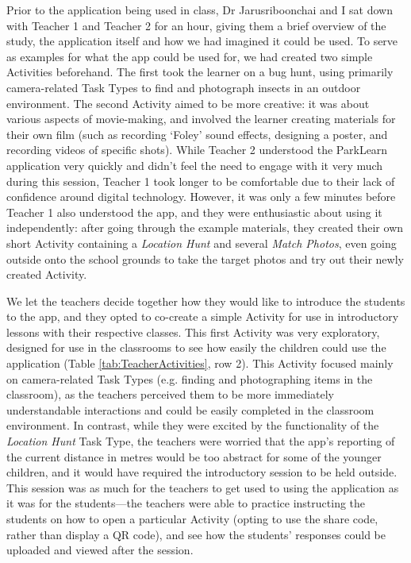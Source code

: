 Prior to the application being used in class, Dr Jarusriboonchai and I sat down with Teacher 1 and Teacher 2 for an hour, giving them a brief overview of the study, the application itself and how we had imagined it could be used. To serve as examples for what the app could be used for, we had created two simple Activities beforehand. The first took the learner on a bug hunt, using primarily camera-related Task Types to find and photograph insects in an outdoor environment. The second Activity aimed to be more creative: it was about various aspects of movie-making, and involved the learner creating materials for their own film (such as recording `Foley' sound effects, designing a poster, and recording videos of specific shots). While Teacher 2 understood the ParkLearn application very quickly and didn't feel the need to engage with it very much during this session, Teacher 1 took longer to be comfortable due to their lack of confidence around digital technology. However, it was only a few minutes before Teacher 1 also understood the app, and they were enthusiastic about using it independently: after going through the example materials, they created their own short Activity containing a \textit{Location Hunt} and several \textit{Match Photos}, even going outside onto the school grounds to take the target photos and try out their newly created Activity. 

We let the teachers decide together how they would like to introduce the students to the app, and they opted to co-create a simple Activity for use in introductory lessons with their respective classes. This first Activity was very exploratory, designed for use in the classrooms to see how easily the children could use the application (Table \ref{tab:TeacherActivities}, row 2). This Activity focused mainly on camera-related Task Types (e.g. finding and photographing items in the classroom), as the teachers perceived them to be more immediately understandable interactions and could be easily completed in the classroom environment. In contrast, while they were excited by the functionality of the \textit{Location Hunt} Task Type, the teachers were worried that the app's reporting of the current distance in metres would be too abstract for some of the younger children, and it would have required the introductory session to be held outside. This session was as much for the teachers to get used to using the application as it was for the students---the teachers were able to practice instructing the students on how to open a particular Activity (opting to use the share code, rather than display a QR code), and see how the students' responses could be uploaded and viewed after the session.

